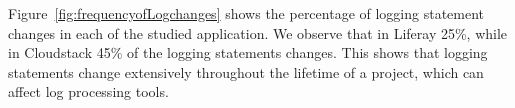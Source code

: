 %
%	


Figure~\ref{fig:frequencyofLogchanges} shows the percentage of logging statement changes in each of the studied application. We observe that in Liferay 25\%, while in Cloudstack 45\% of the logging statements changes. This shows that logging statements change extensively throughout the lifetime of a project, which can affect log processing tools.

%	
%		


